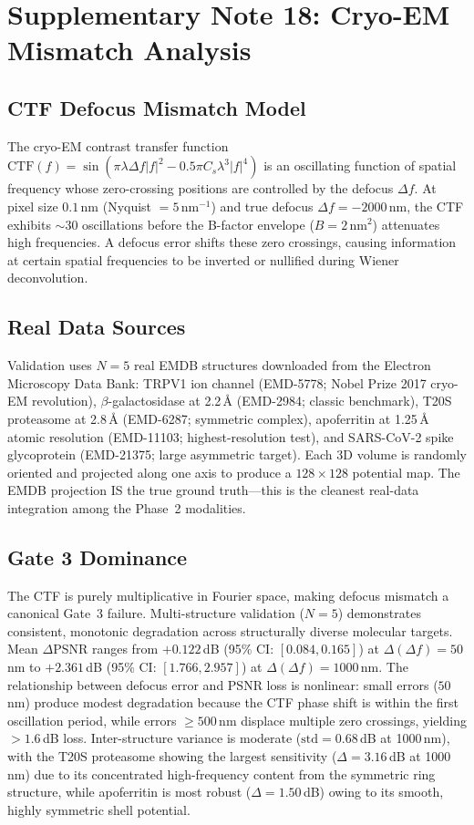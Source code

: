 \documentclass[11pt]{article}
\begin{document}
\section{Supplementary Note 18: Cryo-EM Mismatch Analysis}
\label{sec:note_cryoem}

\subsection{CTF Defocus Mismatch Model}
The cryo-EM contrast transfer function $\mathrm{CTF}(f) = \sin(\pi \lambda \Delta f |f|^2 - 0.5\pi C_s \lambda^3 |f|^4)$ is an oscillating function of spatial frequency whose zero-crossing positions are controlled by the defocus $\Delta f$. At pixel size $0.1$\,nm (Nyquist $= 5$\,nm$^{-1}$) and true defocus $\Delta f = -2000$\,nm, the CTF exhibits ${\sim}30$ oscillations before the B-factor envelope ($B = 2$\,nm$^2$) attenuates high frequencies. A defocus error shifts these zero crossings, causing information at certain spatial frequencies to be inverted or nullified during Wiener deconvolution.

\subsection{Real Data Sources}
Validation uses $N{=}5$ real EMDB structures downloaded from the Electron Microscopy Data Bank: TRPV1 ion channel (EMD-5778; Nobel Prize 2017 cryo-EM revolution), $\beta$-galactosidase at 2.2\,\AA{} (EMD-2984; classic benchmark), T20S proteasome at 2.8\,\AA{} (EMD-6287; symmetric complex), apoferritin at 1.25\,\AA{} atomic resolution (EMD-11103; highest-resolution test), and SARS-CoV-2 spike glycoprotein (EMD-21375; large asymmetric target). Each 3D volume is randomly oriented and projected along one axis to produce a $128 \times 128$ potential map. The EMDB projection IS the true ground truth---this is the cleanest real-data integration among the Phase~2 modalities.

\subsection{Gate 3 Dominance}
The CTF is purely multiplicative in Fourier space, making defocus mismatch a canonical Gate~3 failure. Multi-structure validation ($N{=}5$) demonstrates consistent, monotonic degradation across structurally diverse molecular targets. Mean $\Delta$PSNR ranges from $+0.122$\,dB (95\% CI: $[0.084, 0.165]$) at $\Delta(\Delta f){=}50$\,nm to $+2.361$\,dB (95\% CI: $[1.766, 2.957]$) at $\Delta(\Delta f){=}1000$\,nm.
The relationship between defocus error and PSNR loss is nonlinear: small errors ($50$\,nm) produce modest degradation because the CTF phase shift is within the first oscillation period, while errors $\geq 500$\,nm displace multiple zero crossings, yielding $>1.6$\,dB loss.
Inter-structure variance is moderate ($\mathrm{std} = 0.68$\,dB at 1000\,nm), with the T20S proteasome showing the largest sensitivity ($\Delta{=}3.16$\,dB at 1000\,nm) due to its concentrated high-frequency content from the symmetric ring structure, while apoferritin is most robust ($\Delta{=}1.50$\,dB) owing to its smooth, highly symmetric shell potential.
\end{document}
